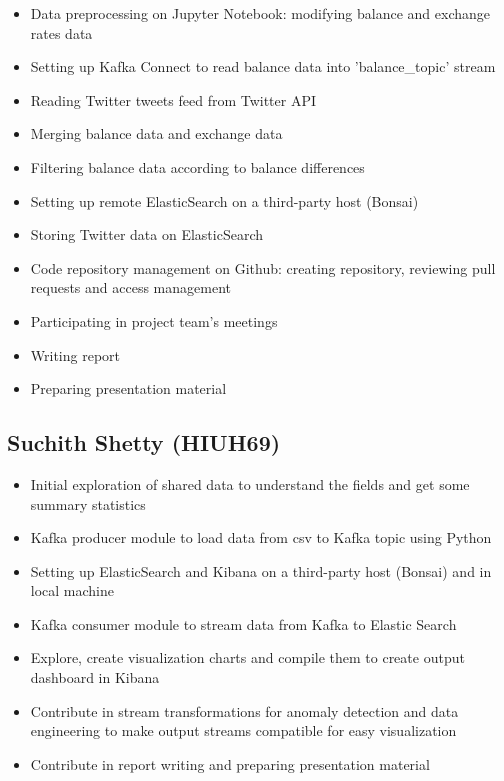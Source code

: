 \documentclass{article}
\begin{document}
\begin{itemize}
    \item Data preprocessing on Jupyter Notebook: modifying balance and exchange rates data
    \item Setting up Kafka Connect to read balance data into 'balance\_topic' stream
    \item Reading Twitter tweets feed from Twitter API
    \item Merging balance data and exchange data
    \item Filtering balance data according to balance differences
    \item Setting up remote ElasticSearch on a third-party host (Bonsai)
    \item Storing Twitter data on ElasticSearch
    \item Code repository management on Github: creating repository, reviewing pull requests and access management
    \item Participating in project team's meetings
    \item Writing report
    \item Preparing presentation material
\end{itemize}

\subsection{Suchith Shetty (HIUH69)}
\begin{itemize}
    \item Initial exploration of shared data to understand the fields and get some summary statistics
    \item Kafka producer module to load data from csv to Kafka topic using Python
    \item Setting up ElasticSearch and Kibana on a third-party host (Bonsai) and in local machine
    \item Kafka consumer module to stream data from Kafka to Elastic Search
    \item Explore, create visualization charts and compile them to create output dashboard in Kibana
    \item Contribute in stream transformations for anomaly detection and data engineering to make output streams compatible for easy visualization
    \item Contribute in report writing and preparing presentation material
\end{itemize}
\end{document}
